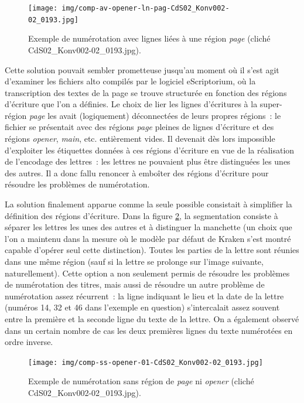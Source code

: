 \documentclass[a4paper,12pt,twoside]{book}
\begin{document}
				\begin{figure}[!h]
					\centering
					\texttt{[image: img/comp-av-opener-ln-pag-CdS02\_Konv002-02\_0193.jpg]}
					\caption{Exemple de numérotation avec lignes liées à une région \textit{page} (cliché CdS02\_Konv002-02\_0193.jpg).}
					\label{annotation-page-66}
				\end{figure}
				
				Cette solution pouvait sembler prometteuse jusqu'au moment où il s'est agit d'examiner les fichiers \gls{alto} compilés par le logiciel eScriptorium, où la transcription des textes de la page se trouve structurée en fonction des régions d'écriture que l'on a définies. Le choix de lier les lignes d'écritures à la super-région \textit{page} les avait (logiquement) déconnectées de leurs propres régions~: le fichier se présentait avec des régions \textit{page} pleines de lignes d'écriture et des régions \textit{opener}, \textit{main}, etc. entièrement vides. Il devenait dès lors impossible d'exploiter les étiquettes données à ces régions d'écriture en vue de la réalisation de l'encodage des lettres~: les lettres ne pouvaient plus être distinguées les unes des autres. Il a donc fallu renoncer à emboîter des régions d'écriture pour résoudre les problèmes de numérotation. 
				
				La solution finalement apparue comme la seule possible consistait à simplifier la définition des régions d'écriture. Dans la figure \ref{comp-ss-opener-193}, la \gls{segmentation} consiste à séparer les lettres les unes des autres et à distinguer la manchette (un choix que l'on a maintenu dans la mesure où le modèle par défaut de Kraken s'est montré capable d'opérer seul cette distinction). Toutes les parties de la lettre sont réunies dans une même région (sauf si la lettre se prolonge sur l'image suivante, naturellement). Cette option a non seulement permis de résoudre les problèmes de numérotation des titres, mais aussi de résoudre un autre problème de numérotation assez récurrent~: la ligne indiquant le lieu et la date de la lettre (numéros 14, 32 et 46 dans l'exemple en question) s'intercalait assez souvent entre la première et la seconde ligne du texte de la lettre. On a également observé dans un certain nombre de cas les deux premières lignes du texte numérotées en ordre inverse.
				
				\begin{figure}[!h]
					\centering
					\texttt{[image: img/comp-ss-opener-01-CdS02\_Konv002-02\_0193.jpg]}
					\caption{Exemple de numérotation sans région de \textit{page} ni \textit{opener} (cliché CdS02\_Konv002-02\_0193.jpg).}
					\label{comp-ss-opener-193}
				\end{figure}
				
\end{document}
